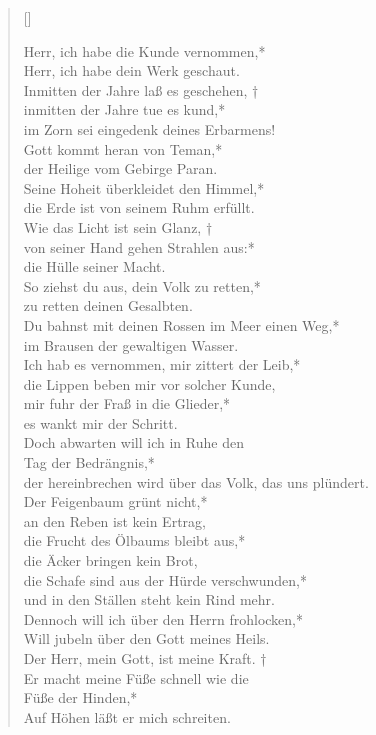 \begin{verse}[\versewidth]
 

Herr, ich habe die Kunde vernommen,*\\
Herr, ich habe dein Werk geschaut.\\
\vin Inmitten der Jahre laß es geschehen, †\\
\vin inmitten der Jahre tue es kund,*\\
\vin im Zorn sei eingedenk deines Erbarmens!\\
Gott kommt heran von Teman,*\\
der Heilige vom Gebirge Paran.\\
\vin Seine Hoheit überkleidet den Himmel,*\\
\vin die Erde ist von seinem Ruhm erfüllt.\\
Wie das Licht ist sein Glanz, † \\
von seiner Hand gehen Strahlen aus:*\\
die Hülle seiner Macht.\\
\vin So ziehst du aus, dein Volk zu retten,*\\
\vin zu retten deinen Gesalbten.\\ 
Du bahnst mit deinen Rossen im Meer einen Weg,*\\
im Brausen der gewaltigen Wasser.\\
\vin Ich hab es vernommen, mir zittert der Leib,*\\
\vin die Lippen beben mir vor solcher Kunde,\\
mir fuhr der Fraß in die Glieder,*\\
es wankt mir der Schritt.\\
\vin Doch abwarten will ich in Ruhe den\\ \vin Tag der Bedrängnis,*\\
\vin der hereinbrechen wird über das Volk, das uns plündert.\\
Der Feigenbaum grünt nicht,*\\
an den Reben ist kein Ertrag,\\
\vin die Frucht des Ölbaums bleibt aus,*\\
\vin die Äcker bringen kein Brot,\\
die Schafe sind aus der Hürde verschwunden,*\\
und in den Ställen steht kein Rind mehr.\\ 
\vin Dennoch will ich über den Herrn frohlocken,*\\
\vin Will jubeln über den Gott meines Heils.\\
Der Herr, mein Gott, ist meine Kraft. †\\
Er macht meine Füße schnell wie die\\ Füße der Hinden,*\\
Auf Höhen läßt er mich schreiten.\\
\end{verse}


